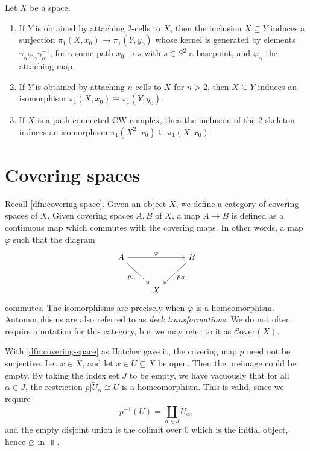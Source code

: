 
\begin{proposition}\label{prp:pi1-cw}
	Let $X$ be a space.
	\begin{enumerate}
		\item If $Y$ is obtained by attaching 2-cells to $X$, then the inclusion $X\subseteq Y$ induces a surjection $\pi _1(X,x_0)\to \pi _1(Y,y_0)$ whose kernel is generated by elements $\gamma _\alpha \varphi _\alpha \gamma ^{-1} _\alpha $, for $\gamma $ some path $x_0 \to s$ with $s\in S^2$ a basepoint, and $\varphi _\alpha $ the attaching map.
		\item If $Y$ is obtained by attaching $n$-cells to $X$ for $n>2$, then $X\subseteq Y$ induces an isomorphism $\pi _1(X,x_0) \cong \pi _1(Y,y_0)$.
		\item If $X$ is a path-connected CW complex, then the inclusion of the 2-skeleton induces an isomorphism $\pi _1(X^2,x_0) \subseteq \pi _1(X,x_0)$.
	\end{enumerate}
\end{proposition}


\section{Covering spaces}


\begin{definition}\label{dfn:covering-space-category}
Recall \cref{dfn:covering-space}. Given an object $X$, we define a category of covering spaces of $X$. Given covering spaces $A,B$ of $X$, a map $A\to B$ is defined as a continuous map which commutes with the covering maps. In other words, a map $\varphi $ such that the diagram
\[
	\begin{tikzcd}[row sep = 2.5em, column sep = 2.5em]
	A \ar[" p_A "', dr] \ar[" \varphi  ", rr]  &  & B \ar[" p_B ", dl]  \\
	 & X & 
\end{tikzcd}
\]
commutes. The isomorphisms are precisely when $\varphi $ is a homeomorphism. Automorphisms are also referred to as \emph{deck transformations}. We do not often require a notation for this category, but we may refer to it as $\mathcal{C}\mathrm{over} (X) $.
\end{definition}

\begin{remark}
	With \cref{dfn:covering-space} as Hatcher gave it, the covering map $p$ need not be surjective. Let $x\in X$, and let $x\in U\subseteq X$ be open. Then the preimage could be empty. By taking the index set $J$ to be empty, we have vacuously that for all $\alpha \in J$, the restriction $p|\widetilde{U}_\alpha \cong U$ is a homeomorphism. This is valid, since we require
	\[
		p ^{-1} (U) = \coprod_{\alpha \in J} \widetilde{U} _\alpha ,
	\]
	and the empty disjoint union is the colimit over 0 which is the initial object, hence $\varnothing $ in $\Top $.
\end{remark}


